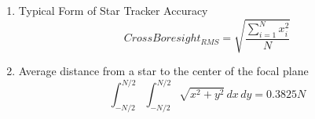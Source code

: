 \begin{enumerate}
    \item Typical Form of Star Tracker Accuracy\cite{accuracy_performance_of_star_trackers}
    \[ CrossBoresight_{RMS} = \sqrt{\frac{\sum_{i=1}^{N} x_{i}^2}{N}} \]

    \item Average distance from a star to the center of the focal plane\cite{accuracy_performance_of_star_trackers} 
    \[ \int_{-N/2}^{N/2}\int_{-N/2}^{N/2} \sqrt{x^2 + y^2} \,dx\,dy = 0.3825N \]

\end{enumerate}
